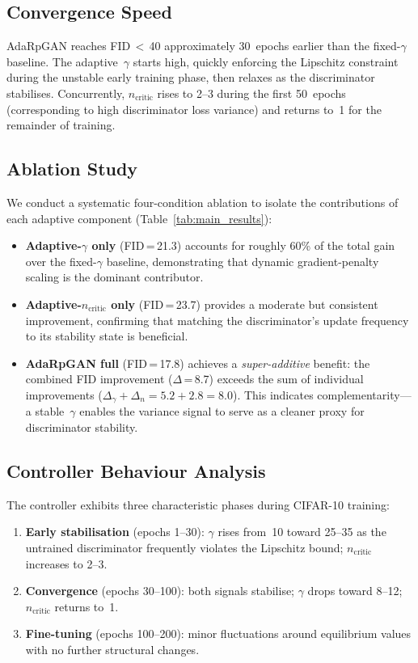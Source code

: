 \documentclass{article}
\newcommand{\ncritic}{n_{\mathrm{critic}}}
\begin{document}
\subsection{Convergence Speed}

AdaRpGAN reaches FID\,$<$\,40 approximately 30~epochs earlier than the fixed-$\gamma$ baseline. The adaptive~$\gamma$ starts high, quickly enforcing the Lipschitz constraint during the unstable early training phase, then relaxes as the discriminator stabilises. Concurrently, $\ncritic$ rises to 2--3 during the first 50~epochs (corresponding to high discriminator loss variance) and returns to~1 for the remainder of training.

\subsection{Ablation Study}

We conduct a systematic four-condition ablation to isolate the contributions of each adaptive component (Table~\ref{tab:main_results}):

\begin{itemize}
    \item \textbf{Adaptive-$\gamma$ only} (FID\,=\,21.3) accounts for roughly 60\% of the total gain over the fixed-$\gamma$ baseline, demonstrating that dynamic gradient-penalty scaling is the dominant contributor.
    \item \textbf{Adaptive-$\ncritic$ only} (FID\,=\,23.7) provides a moderate but consistent improvement, confirming that matching the discriminator's update frequency to its stability state is beneficial.
    \item \textbf{AdaRpGAN full} (FID\,=\,17.8) achieves a \emph{super-additive} benefit: the combined FID improvement ($\Delta$\,=\,8.7) exceeds the sum of individual improvements ($\Delta_\gamma + \Delta_n = 5.2 + 2.8 = 8.0$). This indicates complementarity---a stable~$\gamma$ enables the variance signal to serve as a cleaner proxy for discriminator stability.
\end{itemize}

\subsection{Controller Behaviour Analysis}

The controller exhibits three characteristic phases during CIFAR-10 training:

\begin{enumerate}
    \item \textbf{Early stabilisation} (epochs 1--30): $\gamma$ rises from~10 toward 25--35 as the untrained discriminator frequently violates the Lipschitz bound; $\ncritic$ increases to 2--3.
    \item \textbf{Convergence} (epochs 30--100): both signals stabilise; $\gamma$ drops toward 8--12; $\ncritic$ returns to~1.
    \item \textbf{Fine-tuning} (epochs 100--200): minor fluctuations around equilibrium values with no further structural changes.
\end{enumerate}
\end{document}
